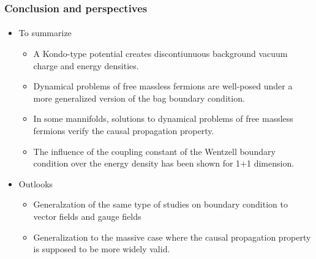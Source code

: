 \documentclass[english]{beamer}
\begin{document}

\begin{frame}[shrink=30]
\frametitle{Conclusion and perspectives}
\framesubtitle{}

\begin{itemize}
\item<1-> To summarize
	\begin{itemize}
	\item<2-> A Kondo-type potential creates discontiunuous background vacuum charge and energy densities.
	\item<3-> Dynamical problems of free massless fermions are well-posed under a more generalized version of the bag boundary condition.
	\item<4-> In some mannifolds, solutions to dynamical problems of free massless fermions verify the causal propagation property.
	\item<5-> The influence of the coupling constant of the Wentzell boundary condition over the energy density has been shown for 1+1 dimension.
	\end{itemize}
\item<6-> Outlooks
	\begin{itemize}
	\item Generalzation of the same type of studies on boundary condition to vector fields and gauge fields
	\item Generalization to the massive case where the causal propagation property is supposed to be more widely valid.
	\end{itemize}
\end{itemize}
\end{frame}
\end{document}
